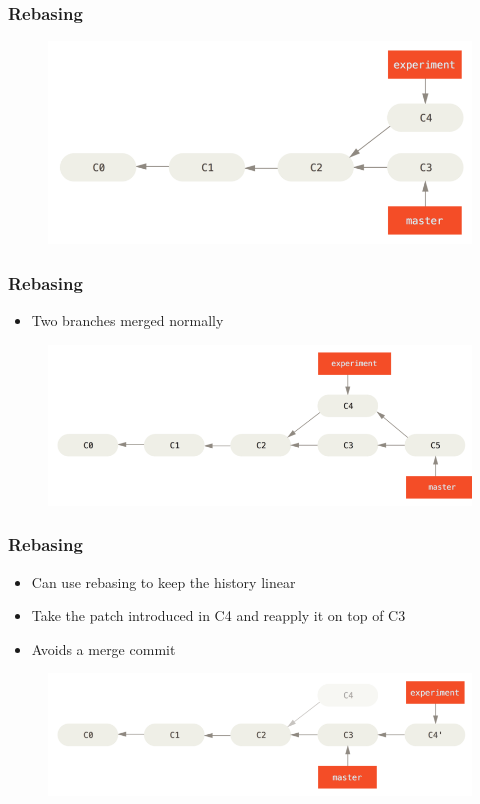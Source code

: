 \documentclass{beamer}
\begin{document}
\begin{frame}
	\frametitle{Rebasing}
	\begin{figure}
		\includegraphics[scale=0.4]{Rebasing-0.png}
	\end{figure}
\end{frame}

\begin{frame}
	\frametitle{Rebasing}
	\begin{itemize}
		\item{Two branches merged normally}
	\end{itemize}
	\begin{figure}
		\includegraphics[scale=0.4]{Rebasing-1.png}
	\end{figure}
\end{frame}

\begin{frame}
	\frametitle{Rebasing}
	\begin{itemize}
		\item{Can use rebasing to keep the history linear}
		\item{Take the patch introduced in C4 and reapply it on top of C3}
		\item{Avoids a merge commit}
	\end{itemize}
	\begin{figure}
		\includegraphics[scale=0.4]{Rebasing-2.png}
	\end{figure}
\end{frame}
\end{document}

